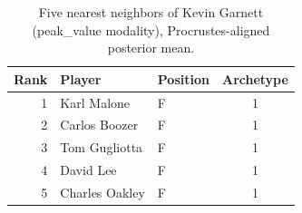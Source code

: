 \begin{table}[htbp]
  \centering\small
  \begin{tabular}{rllc}
    \toprule
    Rank & Player & Position & Archetype \\
    \midrule
    1 & Karl Malone & F & 1 \\
    2 & Carlos Boozer & F & 1 \\
    3 & Tom Gugliotta & F & 1 \\
    4 & David Lee & F & 1 \\
    5 & Charles Oakley & F & 1 \\
    \bottomrule
  \end{tabular}
  \caption{Five nearest neighbors of Kevin Garnett (peak_value modality), Procrustes-aligned posterior mean.}
  \label{tab:Kevin_Garnett_neighbors_peak_value}
\end{table}

